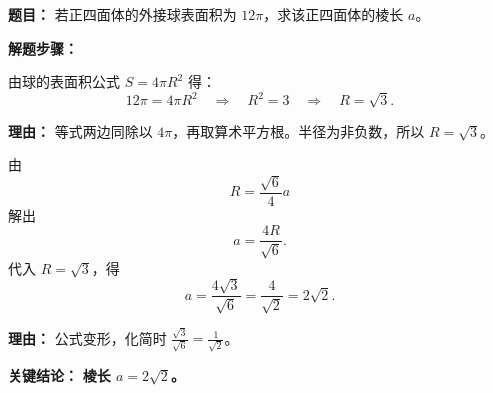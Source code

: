 \begin{examplebox}
	\textbf{\textcolor{CExample}{题目：}} 若正四面体的外接球表面积为 $12\pi$，求该正四面体的棱长 $a$。

	\textbf{\textcolor{CExample}{解题步骤：}}
	\begin{description}[style=nextline, leftmargin=2.8em, labelsep=0.5em, itemsep=0.45em]
		\item[\textbf{第一步（求外接球半径）：}] 由球的表面积公式 $S = 4\pi R^2$ 得：
		      \[
			      12\pi = 4\pi R^2
			      \quad\Rightarrow\quad
			      R^2 = 3
			      \quad\Rightarrow\quad
			      R = \sqrt{3}.
		      \]
		      \par\textbf{理由：} 等式两边同除以 $4\pi$，再取算术平方根。半径为非负数，所以 $R=\sqrt{3}$。

		\item[\textbf{第二步（反求棱长）：}] 由
		      \[
			      R = \frac{\sqrt{6}}{4}a
		      \]
		      解出
		      \[
			      a = \frac{4R}{\sqrt{6}}.
		      \]
		      代入 $R=\sqrt{3}$，得
		      \[
			      a = \frac{4\sqrt{3}}{\sqrt{6}}
			      = \frac{4}{\sqrt{2}}
			      = 2\sqrt{2}.
		      \]
		      \par\textbf{理由：} 公式变形，化简时 $\frac{\sqrt{3}}{\sqrt{6}} = \frac{1}{\sqrt{2}}$。
	\end{description}

	\textbf{\textcolor{CExample}{关键结论：}} \textbf{棱长 $a = 2\sqrt{2}$。}
\end{examplebox}